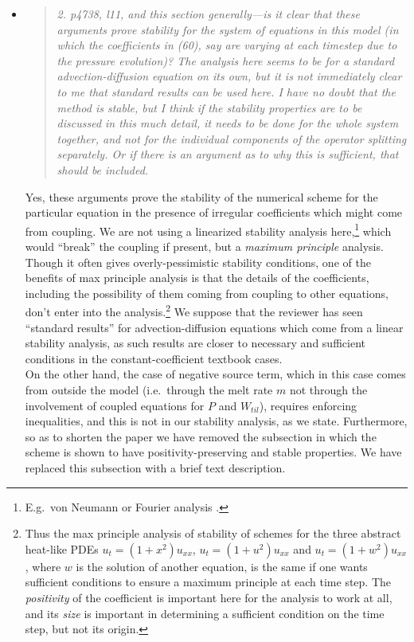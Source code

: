 \documentclass[11pt,reqno]{amsart}
\newcommand{\reply}[2]{
\medskip\medskip
\item  \begin{quote}
\emph{#1}
\end{quote}

\medskip
\noindent #2}
\begin{document}
\begin{itemize}
\reply{2. p4738, l11, and this section generally---is it clear that these arguments prove
stability for the \emph{system} of equations in this model (in which the coefficients in (60),
say are varying at each timestep due to the pressure evolution)? The analysis
here seems to be for a standard advection-diffusion equation on its own, but it
is not immediately clear to me that standard results can be used here. I have
no doubt that the method is stable, but I think if the stability properties are to be
discussed in this much detail, it needs to be done for the whole system together,
and not for the individual components of the operator splitting separately. Or if
there is an argument as to why this is sufficient, that should be included.}
{Yes, these arguments prove the stability of the numerical scheme for the particular equation in the presence of irregular coefficients which might come from coupling.  We are not using a linearized stability analysis here,\footnote{E.g.~von Neumann or Fourier analysis \cite{MortonMayers}.} which would ``break'' the coupling if present, but a \emph{maximum principle} analysis.  Though it often gives overly-pessimistic stability conditions, one of the benefits of max principle analysis is that the details of the coefficients, including the possibility of them coming from coupling to other equations, don't enter into the analysis.\footnote{Thus the max principle analysis of stability of schemes for the three abstract heat-like PDEs $u_t=(1+x^2)u_{xx}$, $u_t=(1+u^2)u_{xx}$ and $u_t=(1+w^2)u_{xx}$, where $w$ is the solution of another equation, is the same if one wants sufficient conditions to ensure a maximum principle at each time step.  The \emph{positivity} of the coefficient is important here for the analysis to work at all, and its \emph{size} is important in determining a sufficient condition on the time step, but not its origin.}  We suppose that the reviewer has seen ``standard results'' for advection-diffusion equations which come from a linear stability analysis, as such results are closer to necessary and sufficient conditions in the constant-coefficient textbook cases.\\
\indent On the other hand, the case of negative source term, which in this case comes from outside the model (i.e.~through the melt rate $m$ not through the involvement of coupled equations for $P$ and $W_{til}$), requires enforcing inequalities, and this is not in our stability analysis, as we state.  Furthermore, so as to shorten the paper we have removed the subsection in which the scheme is shown to have positivity-preserving and stable properties.  We have replaced this subsection with a brief text description.}


\end{itemize}
\end{document}
